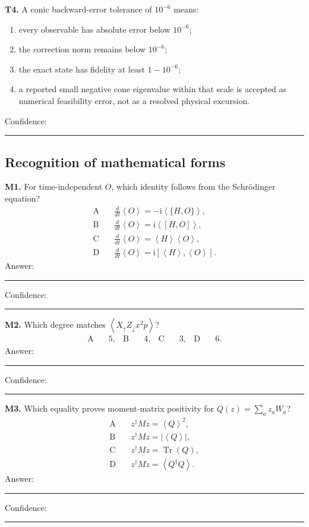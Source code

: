 \documentclass[11pt,letterpaper]{article}
\newcommand{\ii}{\mathrm i}
\newcommand{\Tr}{\operatorname{Tr}}
\newcommand{\expect}[1]{\left\langle #1\right\rangle}
\begin{document}
\textbf{T4.} A conic backward-error tolerance of \(10^{-6}\) means:

\begin{enumerate}[label=\Alph*.]
\item every observable has absolute error below \(10^{-6}\);
\item the correction norm remains below \(10^{-6}\);
\item the exact state has fidelity at least \(1-10^{-6}\);
\item a reported small negative cone eigenvalue within that scale is accepted
as numerical feasibility error, not as a resolved physical excursion.
\end{enumerate}
Confidence: \rule{0.12\textwidth}{0.4pt}

\subsection*{Recognition of mathematical forms}

\textbf{M1.} For time-independent \(O\), which identity follows from the
Schr\"odinger equation?
\[
\begin{aligned}
\mathrm A\quad&\frac{d}{dt}\expect O=-\ii\expect{\{H,O\}},\\
\mathrm B\quad&\frac{d}{dt}\expect O=\ii\expect{[H,O]},\\
\mathrm C\quad&\frac{d}{dt}\expect O=\expect{H}\expect O,\\
\mathrm D\quad&\frac{d}{dt}\expect O=\ii[\expect H,\expect O].
\end{aligned}
\]
Answer: \rule{0.08\textwidth}{0.4pt}\quad Confidence: \rule{0.12\textwidth}{0.4pt}

\textbf{M2.} Which degree matches
\(\expect{X_\uparrow Z_\downarrow x^2p}\)?
\[
\begin{aligned}
\mathrm A\quad&5, &
\mathrm B\quad&4, &
\mathrm C\quad&3, &
\mathrm D\quad&6.
\end{aligned}
\]
Answer: \rule{0.08\textwidth}{0.4pt}\quad Confidence: \rule{0.12\textwidth}{0.4pt}

\textbf{M3.} Which equality proves moment-matrix positivity for
\(Q(z)=\sum_a z_aW_a\)?
\[
\begin{aligned}
\mathrm A\quad&z^\dagger Mz=\expect Q^2,\\
\mathrm B\quad&z^\dagger Mz=\lvert\expect Q\rvert,\\
\mathrm C\quad&z^\dagger Mz=\Tr(Q),\\
\mathrm D\quad&z^\dagger Mz=\expect{Q^\dagger Q}.
\end{aligned}
\]
Answer: \rule{0.08\textwidth}{0.4pt}\quad Confidence: \rule{0.12\textwidth}{0.4pt}
\end{document}
